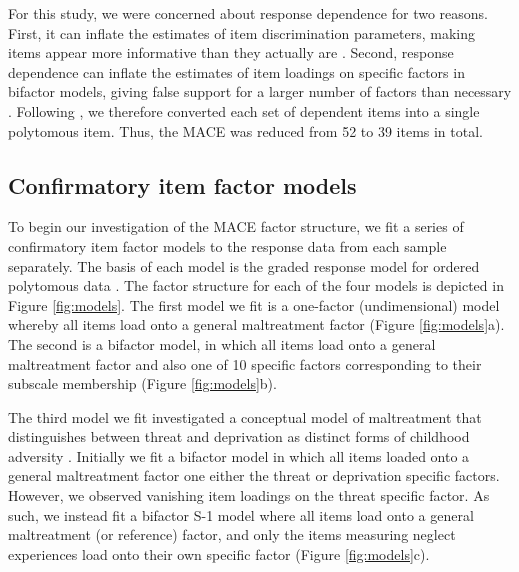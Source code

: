 \documentclass[letterpaper,man,natbib]{apa6}  %
\begin{document}
For this study, we were concerned about response dependence for two reasons. First, it can inflate the estimates of item discrimination parameters, making items appear more informative than they actually are \citep{marais2008formalizing}. Second, response dependence can inflate the estimates of item loadings on specific factors in bifactor models, giving false support for a larger number of factors than necessary \citep{reise2013applying}. Following \cite{marais2008formalizing}, we therefore converted each set of dependent items into a single polytomous item. Thus, the MACE was reduced from 52 to 39 items in total.

\subsection{Confirmatory item factor models}

To begin our investigation of the MACE factor structure, we fit a series of confirmatory item factor models to the response data from each sample separately. The basis of each model is the graded response model for ordered polytomous data \citep{samejima1997graded}. The factor structure for each of the four models is depicted in Figure \ref{fig:models}. The first model we fit is a one-factor (undimensional) model whereby all items load onto a general maltreatment factor (Figure \ref{fig:models}a). The second is a bifactor model, in which all items load onto a general maltreatment factor and also one of 10 specific factors corresponding to their subscale membership (Figure \ref{fig:models}b). 

The third model we fit investigated a conceptual model of maltreatment that distinguishes between threat and deprivation as distinct forms of childhood adversity \citep{mclaughlin2014childhood}. Initially we fit a bifactor model in which all items loaded onto a general maltreatment factor one either the threat or deprivation specific factors. However, we observed vanishing item loadings on the threat specific factor. As such, we instead fit a bifactor S-1 model \citep{eid2017anomalous} where all items load onto a general maltreatment (or reference) factor, and only the items measuring neglect experiences load onto their own specific factor (Figure \ref{fig:models}c). 
\end{document}

